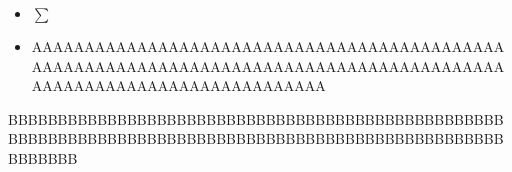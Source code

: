 \documentclass[11pt]{book}
\begin{document}
\begin{itemize}
\item $\sum$
\item
AAAAAAAAAAAAAAAAAAAAAAAAAAAAAAAAAAAAAAAAAAAAAAAAAAAAAAAAAAAAAAAAAAAAAAAAAAAAAAAAAAAAAAAAAAAAAAAAAAAAAAAAAAAAAAAAAAAAAA
\end{itemize}
BBBBBBBBBBBBBBBBBBBBBBBBBBBBBBBBBBBBBBBBBBBBBBBBBBBBBBBBBBBBBBBBBBBBBBBBBBBBBBBBBBBBBBBBBBBBBBBBBBBBBBBBBBB
\end{document}
